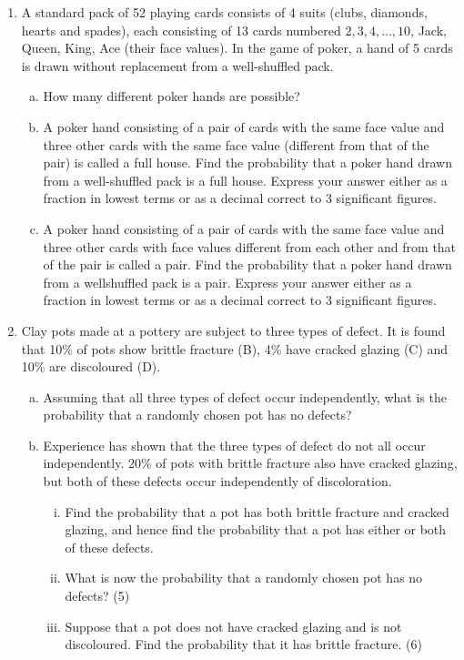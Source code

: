 \documentclass[a4paper,12pt]{article}
\begin{document}

\begin{enumerate}
\item A standard pack of 52 playing cards consists of 4 suits (clubs, diamonds, hearts and
spades), each consisting of 13 cards numbered $2, 3, 4, \ldots, 10$, Jack, Queen, King, Ace
(their face values). In the game of poker, a hand of 5 cards is drawn without
replacement from a well-shuffled pack.
\begin{enumerate}[(a)]
\item How many different poker hands are possible?

\item A poker hand consisting of a pair of cards with the same face value and three
other cards with the same face value (different from that of the pair) is called a
full house. Find the probability that a poker hand drawn from a well-shuffled
pack is a full house. Express your answer either as a fraction in lowest terms
or as a decimal correct to 3 significant figures.

\item A poker hand consisting of a pair of cards with the same face value and three
other cards with face values different from each other and from that of the pair
is called a pair. Find the probability that a poker hand drawn from a wellshuffled
pack is a pair. Express your answer either as a fraction in lowest
terms or as a decimal correct to 3 significant figures.
\end{enumerate}
\item Clay pots made at a pottery are subject to three types of defect. It is found that 10\% of pots show brittle fracture (B), 4\% have cracked glazing (C) and 10\% are discoloured (D). 

\begin{enumerate}[(a)]
\item Assuming that all three types of defect occur independently, what is the probability that a randomly chosen pot has no defects? 
\item  Experience has shown that the three types of defect do not all occur independently. 20\% of pots with brittle fracture also have cracked glazing, but 
both of these defects occur independently of discoloration. 
\begin{enumerate}[(i)]
\item  Find the probability that a pot has both brittle fracture and cracked glazing, and hence 
find the probability that a pot has either or both of these defects. 
\item What is now the probability that a randomly chosen pot has no defects? (5) 
\item Suppose that a pot does not have cracked glazing and is not discoloured. Find the probability that it has brittle fracture. (6) 
\end{enumerate}
\end{enumerate}



\end{enumerate}
\end{document}

